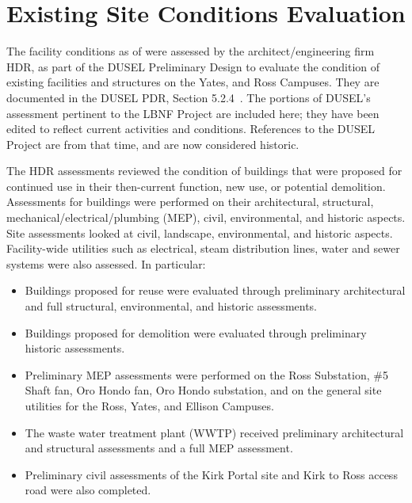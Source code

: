 \section{Existing  Site Conditions Evaluation}
\label{sec:fscf-site-cond-eval}

The facility conditions as of  were assessed by the architect/engineering firm HDR, as part of the DUSEL Preliminary Design to
evaluate the condition of existing facilities and structures on the Yates, and Ross Campuses.
They are documented in the DUSEL PDR, Section 5.2.4~\cite{dusel-pdr}. 
The portions of DUSEL's assessment pertinent to the LBNF Project are included here; they have been edited to reflect current activities and conditions. References to the DUSEL Project are from that time, and are now considered historic.


The HDR assessments reviewed the condition of buildings that were proposed for %
continued use in their then-current function, new use, or potential demolition. Assessments for buildings were performed %
on their architectural, structural, mechanical/electrical/plumbing (MEP), civil, environmental, and historic aspects. Site assessments looked at %
civil, landscape, environmental, and historic aspects. Facility-wide utilities such as electrical, steam distribution lines, water and sewer systems were also assessed. In particular:

\begin{itemize} 
\item Buildings proposed for reuse were evaluated through preliminary architectural and full structural, environmental, and historic assessments. 
\item Buildings proposed for demolition were evaluated through preliminary historic assessments.
\item Preliminary MEP assessments were performed on the Ross Substation, \#5 Shaft fan, Oro Hondo fan, Oro Hondo substation, and on the general site utilities for the Ross, Yates, and Ellison Campuses.
 \item The waste water treatment plant (WWTP) received preliminary architectural and structural assessments and a full MEP assessment.
 \item Preliminary civil assessments of the Kirk Portal site and Kirk to Ross access road were also completed.
 \end{itemize}


